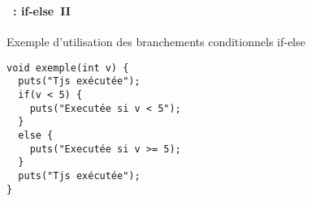 \begin{frame}[containsverbatim]
  \frametitle{\secname}
  \framesubtitle{\subsecname~: if-else~II}

  \begin{exampleblock}{Exemple d'utilisation des branchements conditionnels if-else}
    \begin{verbatim}
void exemple(int v) {
  puts("Tjs exécutée");
  if(v < 5) {
    puts("Executée si v < 5");
  }
  else {
    puts("Executée si v >= 5);
  }
  puts("Tjs exécutée");
}\end{verbatim}
  \end{exampleblock}
\end{frame}

